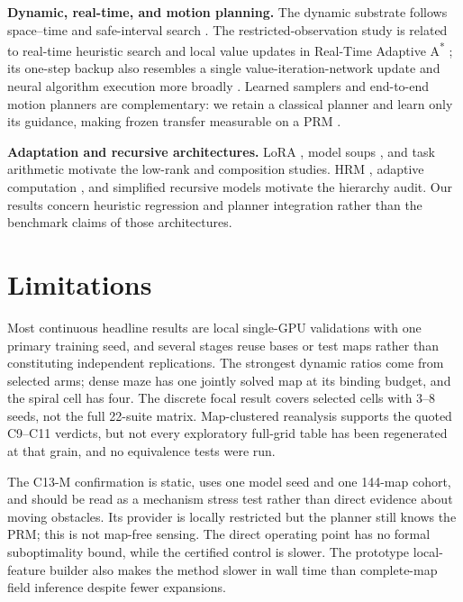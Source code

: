 \documentclass[letterpaper]{article} %
\newcommand{\stage}[1]{\textsc{#1}}
\begin{document}
\textbf{Dynamic, real-time, and motion planning.} The dynamic substrate follows space--time and safe-interval search \citep{silver2005cooperative,phillips2011sipp}. The restricted-observation study is related to real-time heuristic search \citep{korf1990rta} and local value updates in Real-Time Adaptive A\textsuperscript{*} \citep{koenig2006rtaa}; its one-step backup also resembles a single value-iteration-network update \citep{tamar2016vin,lee2018gppn} and neural algorithm execution more broadly \citep{velickovic2021nar}. Learned samplers and end-to-end motion planners \citep{ichter2018sampling,qureshi2019mpnet} are complementary: we retain a classical planner and learn only its guidance, making frozen transfer measurable on a PRM \citep{kavraki1996prm}.

\textbf{Adaptation and recursive architectures.} LoRA \citep{hu2021lora}, model soups \citep{wortsman2022soups}, and task arithmetic \citep{ilharco2022task} motivate the low-rank and composition studies. HRM \citep{wang2025hrm}, adaptive computation \citep{graves2016act,banino2021pondernet}, and simplified recursive models \citep{jolicoeur2025trm} motivate the hierarchy audit. Our results concern heuristic regression and planner integration rather than the benchmark claims of those architectures.

\section{Limitations}

Most continuous headline results are local single-GPU validations with one primary training seed, and several stages reuse bases or test maps rather than constituting independent replications. The strongest dynamic ratios come from selected arms; dense maze has one jointly solved map at its binding budget, and the spiral cell has four. The discrete focal result covers selected cells with 3--8 seeds, not the full 22-suite matrix. Map-clustered reanalysis supports the quoted \stage{C9--C11} verdicts, but not every exploratory full-grid table has been regenerated at that grain, and no equivalence tests were run.

The \stage{C13-M} confirmation is static, uses one model seed and one 144-map cohort, and should be read as a mechanism stress test rather than direct evidence about moving obstacles. Its provider is locally restricted but the planner still knows the PRM; this is not map-free sensing. The direct operating point has no formal suboptimality bound, while the certified control is slower. The prototype local-feature builder also makes the method slower in wall time than complete-map field inference despite fewer expansions.
\end{document}
